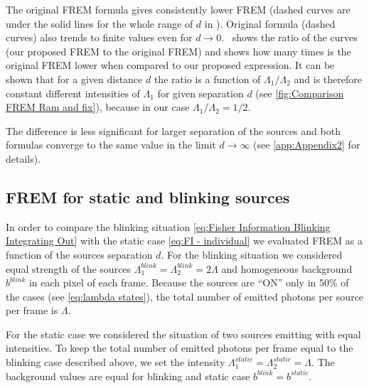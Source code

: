 The original FREM formula gives consistently lower FREM (dashed curves are under the solid lines for the whole range of $d$ in \aaa). Original formula (dashed curves) also trends to finite values even for $d\rightarrow 0$. \bbb\ shows the ratio of the curves (our proposed FREM to the original FREM) and shows how many times is the original FREM lower when compared to our proposed expression. It can be shown that for a given distance $d$ the ratio is a function of $\Lambda_1/\Lambda_2$ and is therefore constant different intensities of $\Lambda_1$ for given separation $d$ (see \autoref{fig:Comparison FREM Ram and fix}\bbb), because in our case $\Lambda_1/\Lambda_2=1/2$.

The difference is less significant for larger separation of the sources and both formulas converge to the same value in the limit $d\rightarrow \infty$ (see \autoref{app:Appendix2} for details).

\subsection{FREM for static and blinking sources}
%
In order to compare the blinking situation \autoref{eq:Fisher Information Blinking Integrating Out} with the static case \autoref{eq:FI - individual} we evaluated FREM as a function of the sources separation $d$. For the blinking situation we considered equal strength of the sources $\Lambda_1^{blink}=\Lambda_2^{blink}=2\Lambda$ and homogeneous background $b^{blink}$ in each pixel of each frame. Because the sources are ``ON'' only in 50\% of the cases (see \autoref{eq:lambda states}), the total number of emitted photons per source per frame is $\Lambda$. 

For the static case we considered the situation of two sources emitting with equal intensities. To keep the total number of emitted photons per frame equal to the blinking case described above, we set the intensity $\Lambda_1^{static}=\Lambda_2^{static}=\Lambda$. The background values are equal for blinking and static case $b^{blink}=b^{static}$. 

